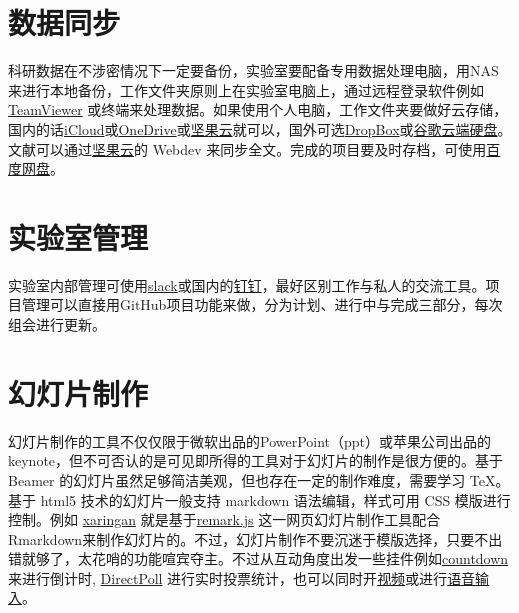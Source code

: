 \documentclass[]{tufte-book}
\begin{document}
\hypertarget{ux6570ux636eux540cux6b65}{%
\section*{数据同步}\label{ux6570ux636eux540cux6b65}}

科研数据在不涉密情况下一定要备份，实验室要配备专用数据处理电脑，用NAS来进行本地备份，工作文件夹原则上在实验室电脑上，通过远程登录软件例如 \href{https://www.teamviewer.com/en-us/}{TeamViewer} 或终端来处理数据。如果使用个人电脑，工作文件夹要做好云存储，国内的话\href{https://www.icloud.com/}{iCloud}或\href{https://onedrive.live.com/about/en-us/}{OneDrive}或\href{https://www.jianguoyun.com/\#/}{坚果云}就可以，国外可选\href{https://www.dropbox.com/}{DropBox}或\href{https://drive.google.com/drive/my-drive}{谷歌云端硬盘}。文献可以通过\href{https://www.jianguoyun.com/\#/}{坚果云}的 Webdev 来同步全文。完成的项目要及时存档，可使用\href{https://pan.baidu.com/}{百度网盘}。

\hypertarget{ux5b9eux9a8cux5ba4ux7ba1ux7406}{%
\section*{实验室管理}\label{ux5b9eux9a8cux5ba4ux7ba1ux7406}}

实验室内部管理可使用\href{https://slack.com/}{slack}或国内的\href{https://www.dingtalk.com/}{钉钉}，最好区别工作与私人的交流工具。项目管理可以直接用GitHub项目功能来做，分为计划、进行中与完成三部分，每次组会进行更新。

\hypertarget{ux5e7bux706fux7247ux5236ux4f5c}{%
\section*{幻灯片制作}\label{ux5e7bux706fux7247ux5236ux4f5c}}

幻灯片制作的工具不仅仅限于微软出品的PowerPoint（ppt）或苹果公司出品的 keynote，但不可否认的是可见即所得的工具对于幻灯片的制作是很方便的。基于 Beamer 的幻灯片虽然足够简洁美观，但也存在一定的制作难度，需要学习 TeX。基于 html5 技术的幻灯片一般支持 markdown 语法编辑，样式可用 CSS 模版进行控制。例如 \href{https://github.com/yihui/xaringan}{xaringan} 就是基于\href{https://remarkjs.com}{remark.js} 这一网页幻灯片制作工具配合Rmarkdown来制作幻灯片的。不过，幻灯片制作不要沉迷于模版选择，只要不出错就够了，太花哨的功能喧宾夺主。不过从互动角度出发一些挂件例如\href{https://pkg.garrickadenbuie.com/countdown}{countdown} 来进行倒计时, \href{https://directpoll.com}{DirectPoll} 进行实时投票统计，也可以同时开\href{https://yihui.name/en/2017/12/html5-camera/}{视频}或进行\href{https://yihui.shinyapps.io/voice/}{语音输入}。
\end{document}
